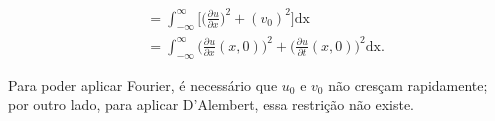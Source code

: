\documentclass[../pde_notes.tex]{subfiles}
\begin{document}
\begin{align*}
	 & = \int_{-\infty}^{\infty}\biggl[\biggl(\frac{\partial^{}u}{\partial x^{}}\biggr)^{2} + (v_{0})^{2}\biggr] \mathrm{dx}                                                                                                                                                                                                                                                                                                                                                                                               \\
	 & = \int_{-\infty}^{\infty}\biggl(\frac{\partial^{}u}{\partial x^{}}(x, 0)\biggr)^{2} + \biggl(\frac{\partial^{}u}{\partial t^{}}(x, 0)\biggr)^{2} \mathrm{dx}.
\end{align*}

\begin{tcolorbox}[
		skin=enhanced,
		title=Observação,
		fonttitle=\bfseries,
		colframe=black,
		colbacktitle=cyan!75!white,
		colback=cyan!15,
		colbacklower=black,
		coltitle=black,
		drop fuzzy shadow,
	]
	Para poder aplicar Fourier, é necessário que \(u_{0}\) e \(v_{0}\) não cresçam rapidamente; por outro lado, para aplicar D'Alembert, essa restrição não existe.
\end{tcolorbox}
\end{document}
